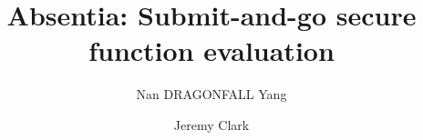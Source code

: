 \documentclass[envcountsect]{llncs}
\begin{document}
\frontmatter
\mainmatter

\title{\Large \bf Absentia: Submit-and-go secure function evaluation}


\author{
	Nan DRAGONFALL Yang \and Jeremy Clark
	}


\maketitle












\clearpage
\appendix
\end{document}
